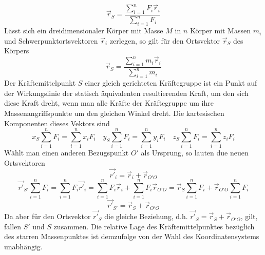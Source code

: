 \begin{equation}
\boxed{\overrightarrow{r}_S=\dfrac{\displaystyle \sum_{i=1}^nF_i\overrightarrow{r}_i}{\displaystyle \sum_{i=1}^nF_i}}
\end{equation}
Lässt sich ein dreidimensionaler Körper mit Masse $M$ in $n$ Körper mit Massen $m_i$ und Schwerpunktortsvektoren $\overrightarrow{r}_i$ zerlegen, so gilt für den Ortsvektor $\overrightarrow{r}_S$ des Körpers
\begin{equation}
\boxed{\overrightarrow{r}_S=\dfrac{\displaystyle \sum_{i=1}^nm_i\overrightarrow{r}_i}{\displaystyle \sum_{i=1}^nm_i}}
\end{equation}
Der Kräftemittelpunkt $S$ einer gleich gerichteten Kräftegruppe ist ein Punkt auf der Wirkungslinie der statisch äquivalenten resultierenden Kraft, um den sich diese Kraft dreht, wenn man alle Kräfte der Kräftegruppe um ihre Massenangriffspunkte um den gleichen Winkel dreht. Die kartesischen Komponenten dieses Vektors sind
\begin{equation}
\boxed{x_S\displaystyle \sum_{i=1}^nF_i=\displaystyle \sum_{i=1}^nx_iF_i}\quad\boxed{y_S\displaystyle \sum_{i=1}^nF_i=\displaystyle \sum_{i=1}^ny_iF_i}\quad \boxed{z_S\displaystyle \sum_{i=1}^nF_i=\displaystyle \sum_{i=1}^nz_iF_i}
\end{equation}
Wählt man einen anderen Bezugspunkt $O'$ als Ursprung, so lauten due neuen Ortsvektoren 
\begin{equation}
\boxed{\overrightarrow{r'}_i=\overrightarrow{r}_i+\overrightarrow{r}_{O'O}}
\end{equation}
\begin{equation}
\boxed{\overrightarrow{r'}_{S'}\displaystyle \sum_{i=1}^nF_i=\displaystyle \sum_{i=1}^nF_i\overrightarrow{r'}_i=\displaystyle \sum_{i=1}^nF_i\overrightarrow{r}_i+\displaystyle \sum_{i=1}^nF_i\overrightarrow{r}_{O'O}=\overrightarrow{r}_S\displaystyle \sum_{i=1}^nF_i+\overrightarrow{r}_{O'O}\displaystyle \sum_{i=1}^nF_i}
\end{equation}
\begin{equation}
\boxed{\overrightarrow{r'}_{S'}=\overrightarrow{r}_S+\overrightarrow{r}_{O'O}}
\end{equation}
Da aber für den Ortsvektor $\overrightarrow{r'}_S$ die gleiche Beziehung, d.h. $\overrightarrow{r'}_S=\overrightarrow{r}_S+\overrightarrow{r}_{O'O}$, gilt, fallen $S'$ und $S$ zusammen. Die relative Lage des Kräftemittelpunktes bezüglich des starren Massenpunktes ist demzufolge von der Wahl des Koordinatensystems unabhängig.
